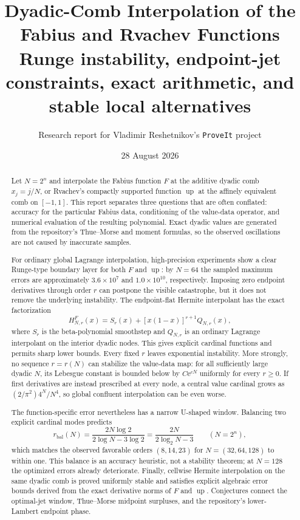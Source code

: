 \documentclass[11pt,oneside]{article}
\title{\bfseries Dyadic-Comb Interpolation of the Fabius and Rvachev Functions\\[0.35em]
\large Runge instability, endpoint-jet constraints, exact arithmetic, and stable local alternatives}
\author{Research report for Vladimir Reshetnikov's \texttt{ProveIt} project}
\date{28 August 2026}
\theoremstyle{definition}
\theoremstyle{remark}
\newcommand{\Up}{\operatorname{up}}
\newcommand{\e}{\mathrm e}
\begin{document}
\maketitle

\begin{abstract}
Let $N=2^n$ and interpolate the Fabius function $F$ at the additive dyadic comb
$x_j=j/N$, or Rvachev's compactly supported function $\Up$ at the affinely equivalent
comb on $[-1,1]$.  This report separates three questions that are often conflated:
accuracy for the particular Fabius data, conditioning of the value-data operator, and
numerical evaluation of the resulting polynomial.  Exact dyadic values are generated from
the repository's Thue--Morse and moment formulas, so the observed oscillations are not
caused by inaccurate samples.

For ordinary global Lagrange interpolation, high-precision experiments show a clear
Runge-type boundary layer for both $F$ and $\Up$: by $N=64$ the sampled maximum errors are
approximately $3.6\times10^7$ and $1.0\times10^{10}$, respectively.  Imposing zero endpoint
derivatives through order $r$ can postpone the visible catastrophe, but it does not remove
the underlying instability.  The endpoint-flat Hermite interpolant has the exact
factorization
\[
 H^F_{N,r}(x)=S_r(x)+[x(1-x)]^{r+1}Q_{N,r}(x),
\]
where $S_r$ is the beta-polynomial smoothstep and $Q_{N,r}$ is an ordinary Lagrange
interpolant on the interior dyadic nodes.  This gives explicit cardinal functions and
permits sharp lower bounds.  Every fixed $r$ leaves exponential instability.  More
strongly, no sequence $r=r(N)$ can stabilize the value-data map: for all sufficiently
large dyadic $N$, its Lebesgue constant is bounded below by $C\e^{cN}$ uniformly for every
$r\ge0$.  If first derivatives are instead prescribed at every node, a central value
cardinal grows as $(2/\pi^2)4^N/N^4$, so global confluent interpolation can be even worse.

The function-specific error nevertheless has a narrow U-shaped window.  Balancing two
explicit cardinal modes predicts
\[
 r_{\mathrm{bal}}(N)=\frac{2N\log2}{2\log N-3\log2}
 =\frac{2N}{2\log_2N-3}\qquad(N=2^n),
\]
which matches the observed favorable orders $(8,14,23)$ for $N=(32,64,128)$ to within one.
This balance is an accuracy heuristic, not a stability theorem; at $N=128$ the optimized
errors already deteriorate.  Finally, cellwise Hermite interpolation on the same dyadic
comb is proved uniformly stable and satisfies explicit algebraic error bounds derived from
the exact derivative norms of $F$ and $\Up$.  Conjectures connect the optimal-jet window,
Thue--Morse midpoint surpluses, and the repository's lower-Lambert endpoint phase.
\end{abstract}
\end{document}
